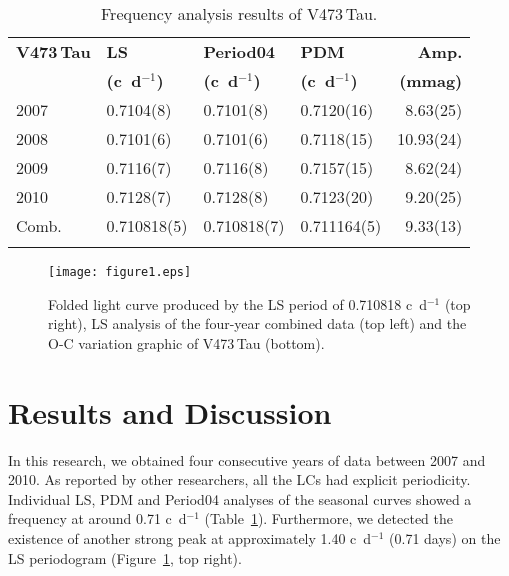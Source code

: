 \documentclass[]{article}
\begin{document}
\begin{table}[]
\small
\begin{center}
\caption{Frequency analysis results of V473\,Tau.}
\smallskip
\begin{tabular}{l l l l r} 
\hline
\noalign{\smallskip}
\textbf{V473\,Tau}	&\textbf{LS}&\textbf{Period04}&\textbf{PDM}&\textbf{Amp.}\\
&\textbf{(c~d$^{-1}$)}&\textbf{(c~d$^{-1}$)}&\textbf{(c~d$^{-1}$)}&\textbf{(mmag)}\\
\noalign{\smallskip}
\hline
\noalign{\smallskip}																	
2007	&	0.7104(8)	&	0.7101(8)	&	0.7120(16)	&	8.63(25)	\\ \noalign{\smallskip}
2008	&	0.7101(6)	&	0.7101(6)	&	0.7118(15)	&	10.93(24)	\\ \noalign{\smallskip}
2009	&	0.7116(7)	&	0.7116(8)	&	0.7157(15)	&	8.62(24)	\\ \noalign{\smallskip}
2010	&	0.7128(7)	&	0.7128(8)	&	0.7123(20)	&	9.20(25)      \\ \noalign{\smallskip}
Comb.	&	0.710818(5)	&	0.710818(7)	&	0.711164(5)	&	9.33(13)	\\ \noalign{\smallskip}
\hline 
\end{tabular}
\label{tab:table1}
\end{center}
\end{table} 




\begin{figure}[!t]
\texttt{[image: figure1.eps]}
\caption{Folded light curve produced by the LS period of 0.710818 c~d$^{-1}$ (top right), LS analysis of the four-year combined data (top left) and the O-C variation graphic of V473\,Tau (bottom).}
\label{fig:figure1}
\end{figure}



\section{Results and Discussion}


In this research, we obtained four consecutive years of data between 2007 and 2010. As reported by other researchers, all the LCs had explicit periodicity. Individual LS, PDM and Period04 analyses of the seasonal curves showed a frequency at around 0.71 c~d$^{-1}$ (Table~\ref{tab:table1}). Furthermore, we detected the existence of another strong peak at approximately 1.40 c~d$^{-1}$ (0.71 days) on the LS periodogram (Figure~\ref{fig:figure1}, top right).
\end{document}
